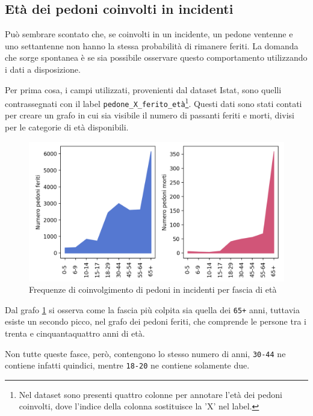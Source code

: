 \documentclass[a4paper,12pt]{report}
\newcommand{\columnstyle}[1]{\texttt{#1}}
\begin{document}
\subsection{Età dei pedoni coinvolti in incidenti}

Può sembrare scontato che, se coinvolti in un incidente, un pedone ventenne e 
uno settantenne non hanno la stessa probabilità di rimanere feriti.
La domanda che sorge spontanea è se sia possibile osservare questo comportamento 
utilizzando i dati a disposizione.

Per prima cosa, i campi utilizzati, provenienti dal dataset Istat, sono quelli contrassegnati 
con il label 
\columnstyle{pedone\_X\_ferito\_età}\footnote{Nel dataset sono presenti quattro colonne per 
annotare l'età dei pedoni coinvolti, dove l'indice della colonna sostituisce la 'X' nel label.}. 
Questi dati sono stati contati per creare un grafo in cui sia visibile 
il numero di passanti feriti e morti, divisi per le categorie di età disponibili.

\begin{figure}
    \includegraphics[width=\linewidth]{../src/incidenti/incidenti_senza_coords/pedoni/eta_pedoni_iniziale.png}
    \caption{Frequenze di coinvolgimento di pedoni in incidenti per fascia di età}
    \label{fig:eta-pedoni-iniziale}
\end{figure}

Dal grafo \ref{fig:eta-pedoni-iniziale} si osserva come la fascia più colpita 
sia quella dei \columnstyle{65+} anni, tuttavia esiste un secondo picco, nel grafo dei 
pedoni feriti, che comprende le persone tra i trenta e cinquantaquattro anni di età.

Non tutte queste fasce, però, contengono lo stesso numero di anni, 
\columnstyle{30-44} ne contiene infatti quindici, mentre 
\columnstyle{18-20} ne contiene solamente due.
\end{document}
